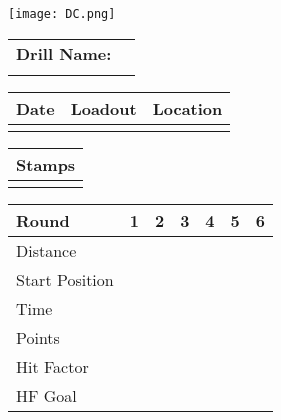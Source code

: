 \documentclass[../Cover.tex]{subfiles}
\begin{document}
	\begin{minipage}[t][0.15\textheight][t]{0.1\textwidth} 
		\texttt{[image: DC.png]}
	\end{minipage}
	\hfill
	\begin{minipage}[t][0.15\textheight][t]{0.8\textwidth}
		\begin{tabular}{ p{} l  }
			\\		
			\textbf{Drill Name:} \\
			\\[0.03\textheight]
			\hline
		\end{tabular}
		\quad
		\small \begin{tabular}{ | p{} | p{} | p{} |}
			\hline
			Date & Loadout & Location\\ 
			\hline
			&  &  \\ 
			\hline
		\end{tabular}
	\end{minipage}
	
	\begin{tabular}{p{}|}
		Stamps \\
		\hline
		\\[0.65\textheight]
	\end{tabular}
	\quad
	\begin{tabular}{ | p{} | p{} | p{} | p{} | p{} | p{} | p{} |}
		\hline
		Round & 1 & 2 & 3 & 4 & 5 & 6 \\
		\hline
		\tiny Distance & & & & & & \\[0.05\textheight]
		\hline
		\tiny Start Position & & & & & & \\[0.05\textheight]
		\hline
		\tiny Time & & & & & & \\[0.05\textheight]
		\hline
		\tiny Points & & & & & & \\[0.05\textheight]
		\hline
		\tiny Hit Factor & & & & & & \\[0.05\textheight]
		\hline
		\tiny HF Goal & & & & & & \\[0.05\textheight]
		\hline
	\end{tabular}
\end{document}
